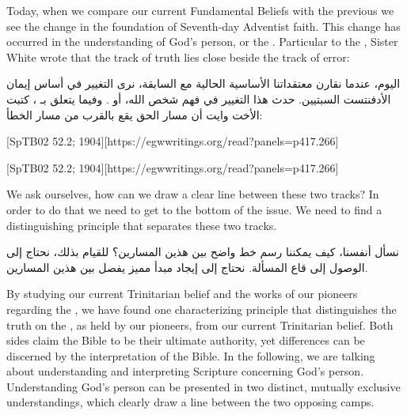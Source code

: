 



Today, when we compare our current Fundamental Beliefs with the previous  we see the change in the foundation of Seventh-day Adventist faith. This change has occurred in the understanding of God’s person, or the . Particular to the , Sister White wrote that the track of truth lies close beside the track of error:


اليوم، عندما نقارن معتقداتنا الأساسية الحالية مع  السابقة، نرى التغيير في أساس إيمان الأدفنتست السبتيين. حدث هذا التغيير في فهم شخص الله، أو . وفيما يتعلق بـ ، كتبت الأخت وايت أن مسار الحق يقع بالقرب من مسار الخطأ:


[SpTB02 52.2; 1904][https://egwwritings.org/read?panels=p417.266]


[SpTB02 52.2; 1904][https://egwwritings.org/read?panels=p417.266]


We ask ourselves, how can we draw a clear line between these two tracks? In order to do that we need to get to the bottom of the issue. We need to find a distinguishing principle that separates these two tracks.


نسأل أنفسنا، كيف يمكننا رسم خط واضح بين هذين المسارين؟ للقيام بذلك، نحتاج إلى الوصول إلى قاع المسألة. نحتاج إلى إيجاد مبدأ مميز يفصل بين هذين المسارين.


By studying our current Trinitarian belief and the works of our pioneers regarding the , we have found one characterizing principle that distinguishes the truth on the , as held by our pioneers, from our current Trinitarian belief. Both sides claim the Bible to be their ultimate authority, yet differences can be discerned by the interpretation of the Bible. In the following, we are talking about understanding and interpreting Scripture concerning God’s person. Understanding God’s person can be presented in two distinct, mutually exclusive understandings, which clearly draw a line between the two opposing camps.


